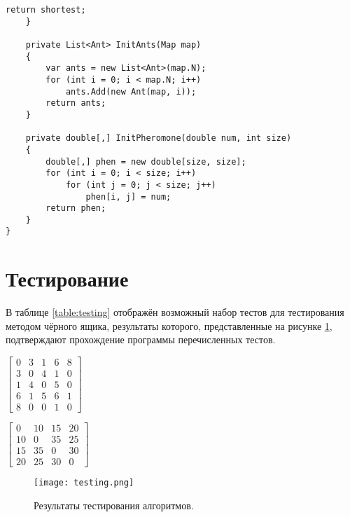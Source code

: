 \begin{lstlisting}[language={[Sharp]C}, label=lst:ant, caption=Реализация муравьиного алгоритма]
        return shortest;
    }

    private List<Ant> InitAnts(Map map)
    {
        var ants = new List<Ant>(map.N);
        for (int i = 0; i < map.N; i++)
            ants.Add(new Ant(map, i));
        return ants;
    }

    private double[,] InitPheromone(double num, int size)
    {
        double[,] phen = new double[size, size];
        for (int i = 0; i < size; i++)
            for (int j = 0; j < size; j++)
                phen[i, j] = num;
        return phen;
    }
}
        \end{lstlisting}
    
        
    \section{Тестирование}
        В таблице \ref{table:testing} отображён возможный набор тестов
        для тестирования методом чёрного ящика, результаты которого, 
        представленные на рисунке \ref{png:testing:result}, подтверждают
        прохождение программы перечисленных тестов.
        
        $\begin{bmatrix}
			0 & 3 & 1 & 6 & 8\\
			3 & 0 & 4 & 1 & 0\\
			1 & 4 & 0 & 5 & 0\\
			6 & 1 & 5 & 6 & 1\\
			8 & 0 & 0 & 1 & 0
        \end{bmatrix}$ 
        
        $\begin{bmatrix}
			0 & 10 & 15 & 20\\
			10 & 0 & 35 & 25\\
			15 & 35 & 0 & 30\\
			20 & 25 & 30 & 0
		\end{bmatrix}$

        \begin{figure}[h!]
            \centering
            \texttt{[image: testing.png]}
            \caption{Результаты тестирования алгоритмов.}
            \label{png:testing:result}
        \end{figure}
\newpage